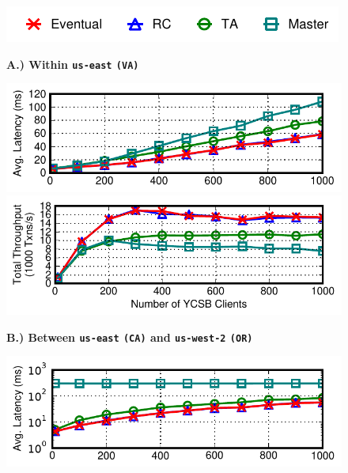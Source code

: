 \begin{figure}[t!]
\begin{center}
\hspace{2em}\includegraphics[width=.8\columnwidth]{figs/strategylegend.pdf}
\end{center}\vspace{-2.5em}
\begin{center}\small\textbf{A.) Within \texttt{us-east} \texttt{(VA)}}\end{center}\vspace{-1.5em}
\includegraphics[width=\figfactor\columnwidth]{figs/finals/2lan-threads-lats.pdf}\vspace{-.5em}
\includegraphics[width=\figfactor\columnwidth]{figs/finals/2lan-threads-thru.pdf}\vspace{-.75em}
\begin{center}\small\textbf{B.) Between \texttt{us-east} \texttt{(CA)} and \texttt{us-west-2} \texttt{(OR)}}\end{center}\vspace{-1.5em}
\includegraphics[width=\figfactor\columnwidth]{figs/finals/2wan-threads-lats-log.pdf}\vspace{-.5em}

\end{figure}
